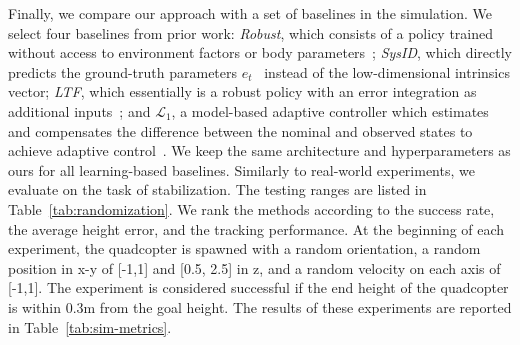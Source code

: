 Finally, we compare our approach with a set of baselines in the simulation.
%
We select four baselines from prior work: \emph{Robust}, which consists of a policy trained without access to environment factors or body parameters~\cite{tobin2017domain, peng2018sim}; \emph{SysID}, which directly predicts the ground-truth parameters $e_t$~\cite{SysID} instead of the low-dimensional intrinsics vector; \emph{LTF}, which essentially is a robust policy with an error integration as additional inputs~\cite{LTF}; and $\mathcal{L}_1$, a model-based adaptive controller which estimates and compensates the difference between the nominal and observed states to achieve adaptive control~\cite{cao2008design,hovakimyan2010l1,hanover2021performance}. 
%
We keep the same architecture and hyperparameters as ours for all learning-based baselines. 
%
%
Similarly to real-world experiments, we evaluate on the task of stabilization. The testing ranges are listed in Table~\ref{tab:randomization}. We rank the methods according to the success rate, the average height error, and the tracking performance.
%
At the beginning of each experiment, the quadcopter is spawned with a random orientation, a random position in x-y of [-1,1] and [0.5, 2.5] in z, and a random velocity on each axis of [-1,1].
%
The experiment is considered successful if the end height of the quadcopter is within 0.3m from the goal height.
%
The results of these experiments are reported in Table~\ref{tab:sim-metrics}. 
%

